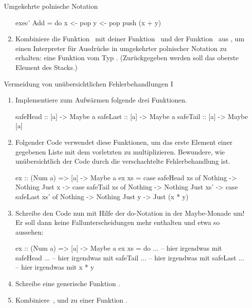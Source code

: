 \documentclass{uebblatt}
\begin{document}
\begin{aufgabe}{Umgekehrte polnische Notation}
\begin{enumerate}
\begin{haskellcode}
exec' Add = do
    x <- pop
    y <- pop
    push (x + y)
\end{haskellcode}
\item Kombiniere die Funktion~ mit deiner Funktion~ und der
Funktion~ aus , um
einen Interpreter für Ausdrücke in umgekehrter polnischer Notation zu erhalten:
eine Funktion vom Typ . (Zurückgegeben
werden soll das oberste Element des Stacks.)
\end{enumerate}
\end{aufgabe}

\begin{aufgabe}{Vermeidung von unübersichtlichen Fehlerbehandlungen I}
\begin{enumerate}
\item Implementiere zum Aufwärmen folgende drei Funktionen.

\begin{haskellcode}
safeHead :: [a] -> Maybe a
safeLast :: [a] -> Maybe a
safeTail :: [a] -> Maybe [a]
\end{haskellcode}

\item Folgender Code verwendet diese Funktionen, um das erste Element einer
gegebenen Liste mit dem vorletzten zu multiplizieren. Bewundere, wie unübersichtlich
der Code durch die verschachtelte Fehlerbehandlung ist.

\begin{haskellcode}
ex :: (Num a) => [a] -> Maybe a
ex xs = case safeHead xs of
    Nothing -> Nothing
    Just x  -> case safeTail xs of
        Nothing  -> Nothing
        Just xs' -> case safeLast xs' of
            Nothing -> Nothing
            Just y  -> Just (x * y)
\end{haskellcode}

\item Schreibe den Code nun mit Hilfe der do-Notation in der Maybe-Monade um!
Er soll dann keine Fallunterscheidungen mehr enthalten und etwa so aussehen:

\begin{haskellcode}
ex :: (Num a) => [a] -> Maybe a
ex xs = do
    ...   -- hier irgendwas mit safeHead
    ...   -- hier irgendwas mit safeTail
    ...   -- hier irgendwas mit safeLast
    ...   -- hier irgendwas mit x * y
\end{haskellcode}

\item Schreibe eine generische Funktion .

\item Kombiniere~, 
und  zu einer Funktion .
\end{enumerate}
\end{aufgabe}
\end{document}
